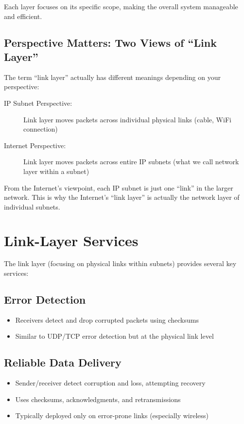 \documentclass[../../compsys.tex]{subfiles}
\begin{document}
Each layer focuses on its specific scope, making the overall system manageable and efficient.

\subsection{Perspective Matters: Two Views of ``Link Layer''}

The term ``link layer'' actually has different meanings depending on your perspective:

\begin{description}
    \item[IP Subnet Perspective:] Link layer moves packets across individual physical links (cable, WiFi connection)
    \item[Internet Perspective:] Link layer moves packets across entire IP subnets (what we call network layer within a subnet)
\end{description}

From the Internet's viewpoint, each IP subnet is just one ``link'' in the larger network. This is why the Internet's ``link layer'' is actually the network layer of individual subnets.

\section{Link-Layer Services}

The link layer (focusing on physical links within subnets) provides several key services:

\subsection{Error Detection}
\begin{itemize}
    \item Receivers detect and drop corrupted packets using checksums
    \item Similar to UDP/TCP error detection but at the physical link level
\end{itemize}

\subsection{Reliable Data Delivery}
\begin{itemize}
    \item Sender/receiver detect corruption and loss, attempting recovery
    \item Uses checksums, acknowledgments, and retransmissions
    \item Typically deployed only on error-prone links (especially wireless)
\end{itemize}
\end{document}
